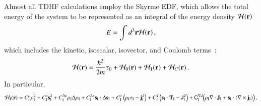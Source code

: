 Almost all TDHF calculations employ the Skyrme EDF, which allows the total energy of the system to be represented
as an integral of the energy density ${\cal H}(\mathbf{r})$\,\citep{engel1975}
\begin{equation}
\label{eq:energy}
E = \int d^3\mathbf{r} {\cal H}(\mathbf{r})\,,
\end{equation}
which includes the kinetic,
isoscalar, isovector, and Coulomb terms \,\citep{dobaczewski1995}:
\begin{equation}
\label{eq:edensity}
{\cal H}(\mathbf{r}) = \frac{\hbar^2}{2m}\tau_0
+ {\cal H}_0(\mathbf{r})
+ {\cal H}_1(\mathbf{r})
+ {\cal H}_C(\mathbf{r})\,.
\end{equation}
In particular,
	\begin{equation}
	\label{eq:efunctional}
	{\cal H}_\mathrm{I}(\mathbf{r})
	= C_\mathrm{I}^{\rho}            \rho_\mathrm{I}^2
	+  C_\mathrm{I}^{   s}            \mathbf{s}_\mathrm{I}^2
	+  C_\mathrm{I}^{\Delta\rho}      \rho_\mathrm{I}\Delta\rho_\mathrm{I}
	+  C_\mathrm{I}^{\Delta s}        \mathbf{s}_\mathrm{I}\cdot\Delta\mathbf{s}_\mathrm{I}
	+  C_\mathrm{I}^{\tau}      \left(\rho_\mathrm{I}\tau_\mathrm{I}-\mathbf{j}_\mathrm{I}^2  \right)
	+  C_\mathrm{I}^{   T}      \Big(\mathbf{s}_\mathrm{I}\cdot
	\mathbf{T}_\mathrm{I} - \sf{J}_\mathrm{I}^2\Big)
	+ C_\mathrm{I}^{\nabla J}  \Big(\rho_\mathrm{I}\mathbf{\nabla}\cdot\mathbf{J}_\mathrm{I}
	+ \mathbf{s}_\mathrm{I}\cdot
	(\mathbf{\nabla}\times\mathbf{j}_\mathrm{I})\Big)\,,
	\end{equation}


